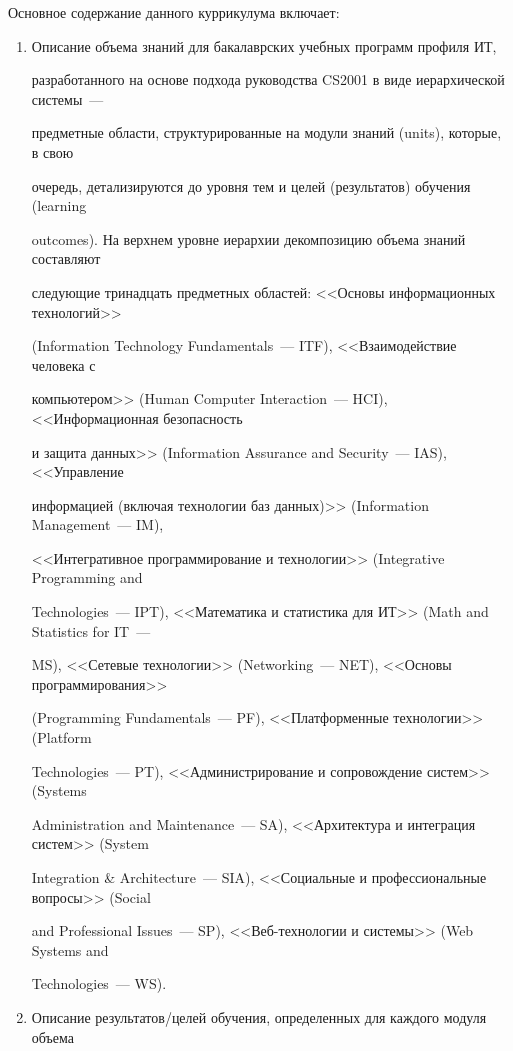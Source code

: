 Основное содержание данного куррикулума включает:

\begin{enumerate}[1.]

\item Описание объема знаний для бакалаврских учебных программ профиля ИТ, 

разработанного на основе подхода руководства CS2001 в виде иерархической системы~--- 

предметные области, структурированные на модули знаний (units), которые, в свою 

очередь, детализируются до уровня тем и целей (результатов) обучения (learning 

outcomes). На верхнем уровне иерархии декомпозицию объема знаний составляют 

следующие тринадцать предметных областей: <<Основы информационных технологий>> 

(Information Technology Fundamentals~--- ITF), <<Взаимодействие человека с 

компьютером>> (Human Computer Interaction~--- HCI), <<Информационная безопасность 

и защита данных>> (Information Assurance and Security~--- IAS), <<Управление 

информацией (включая технологии баз данных)>> (Information Management~--- IM), 

<<Интегративное программирование и технологии>> (Integrative Programming and 

Technologies~--- IPT), <<Математика и статистика для ИТ>> (Math and Statistics for IT~--- 

MS), <<Сетевые технологии>> (Networking~--- NET), <<Основы программирования>> 

(Programming Fundamentals~--- PF), <<Платформенные технологии>> (Platform 

Technologies~--- PT), <<Администрирование и сопровождение систем>> (Systems 

Administration and Maintenance~--- SA), <<Архитектура и интеграция систем>> (System 

Integration \& Architecture~--- SIA), <<Социальные и профессиональные вопросы>> (Social 

and Professional Issues~--- SP), <<Веб-технологии и системы>> (Web Systems and 

Technologies~--- WS).

\item Описание результатов/целей обучения, определенных для каждого модуля объема 


\end{enumerate}
